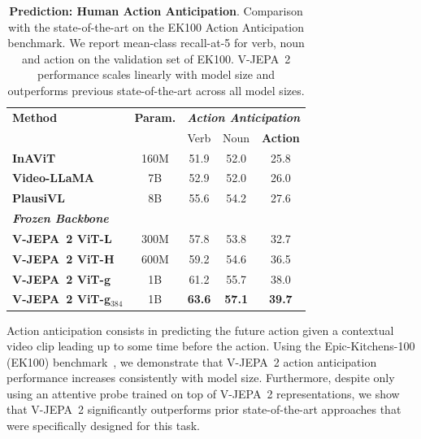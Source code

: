 \documentclass[]{fairmeta}
\newcommand{\model}{V-JEPA~2\xspace}
\begin{document}
\begin{table}[t]
  \centering
    \small
    \caption{\small{\bf Prediction: Human Action Anticipation}. Comparison with the state-of-the-art on the EK100 Action Anticipation benchmark. We report mean-class recall-at-5 for verb, noun and action on the validation set of EK100. \model performance scales linearly with model size and outperforms previous state-of-the-art across all model sizes.}
    \label{tb:prediction_main}
    \begin{tabular}{l c c c c}
      \bf Method & \bf Param. & \multicolumn{3}{c}{\bf\it Action Anticipation}  \\
      & & \small Verb & \small Noun & \small \bf Action \\
        \toprule
        {\bf InAViT}~{\small\citep{roy2024interaction}} & 160M & 51.9 & 52.0 & 25.8 \\
         {\bf Video-LLaMA}~{\small\citep{zhang2023video}}  & 7B & 52.9 & 52.0 & 26.0 \\
        {\bf PlausiVL}~{\small\citep{mittal2024can}}  & 8B & 55.6 & 54.2 & 27.6 \\
        \midrule
        \multicolumn{5}{l}{\bf\it Frozen Backbone}\\[1ex]
        \bf \model ViT-L  & 300M & 57.8 & 53.8 & 32.7 \\
        \bf \model ViT-H & 600M & 59.2 & 54.6 & 36.5 \\
        \bf \model ViT-g & 1B & 61.2 & 55.7 & 38.0 \\
        \bf \model ViT-g$_{384}$ & 1B & \bf 63.6 & \bf 57.1 & \bf 39.7 \\
\end{tabular}
\end{table}

Action anticipation consists in predicting the future action given a contextual video clip leading up to some time before the action. Using the Epic-Kitchens-100 (EK100) benchmark~\citep{Damen2022RESCALING}, we demonstrate that \model action anticipation performance increases consistently with model size. Furthermore, despite only using an attentive probe trained on top of \model representations, we show that \model significantly outperforms prior state-of-the-art approaches that were specifically designed for this task.
\end{document}
